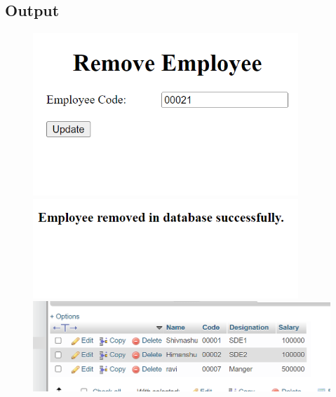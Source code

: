 \documentclass{article}
\begin{document}
\subsection*{Output}
\begin{figure}[H]
  \centering
  \includegraphics[width=10cm]{7/out.png}
  \includegraphics[width=10cm]{7/out2.png}
  \includegraphics[width=14cm]{7/out3.png}
\end{figure}
\end{document}
